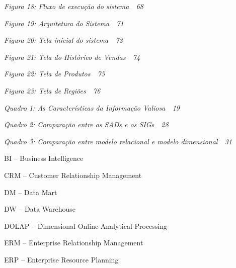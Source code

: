 \documentclass[a4paper]{article}
\begin{document}
{\sffamily\itshape
\textup{Figura 18: Fluxo de execu\c{c}\~ao do sistema\ \ 68}}

{\sffamily\itshape
\textup{Figura 19: Arquitetura do Sistema\ \ 71}}

{\sffamily\itshape
\textup{Figura 20: Tela inicial do sistema\ \ 73}}

{\sffamily\itshape
\textup{Figura 21: Tela do Hist\'orico de Vendas\ \ 74}}

{\sffamily\itshape
\textup{Figura 22: Tela de Produtos\ \ 75}}

{\sffamily\itshape
\textup{Figura 23: Tela de Regi\~oes\ \ 76}}


\bigskip


\bigskip



\bigskip

{\sffamily\itshape
\textup{Quadro 1: As Caracter\'isticas da Informa\c{c}\~ao Valiosa\ \ 19}}

{\sffamily\itshape
\textup{Quadro 2: Compara\c{c}\~ao entre os SADs e os SIGs\ \ 28}}

{\sffamily\itshape
\textup{Quadro 3: Compara\c{c}\~ao entre modelo relacional e modelo dimensional\ \ 31}}


\bigskip



\bigskip

\foreignlanguage{portuges}{\textsf{BI -- Business Intelligence}}

\foreignlanguage{english}{\textsf{CRM -- Customer Relationship Management}}

{\sffamily
DM -- Data Mart}

{\sffamily
DW -- Data Warehouse}

\foreignlanguage{english}{\textsf{DOLAP -- Dimensional Online Analytical Processing}}

\foreignlanguage{english}{\textsf{ERM -- Enterprise Relationship Management}}

\foreignlanguage{english}{\textsf{ERP -- Enterprise Resource Planning}}
\end{document}
